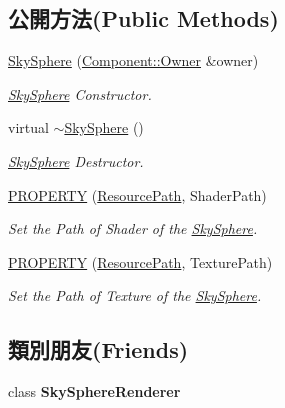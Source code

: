 \subsection*{公開方法(Public Methods)}
\begin{DoxyCompactItemize}
\item 
\hyperlink{class_i_dream_sky_1_1_sky_sphere_a8e55896b6fb27e611be90451c67910a5}{Sky\+Sphere} (\hyperlink{class_i_dream_sky_1_1_component_1_1_owner}{Component\+::\+Owner} \&owner)
\begin{DoxyCompactList}\small\item\em \hyperlink{class_i_dream_sky_1_1_sky_sphere}{Sky\+Sphere} Constructor. \end{DoxyCompactList}\item 
virtual \hyperlink{class_i_dream_sky_1_1_sky_sphere_a4747bb606783031db88b2e622184e6d0}{$\sim$\+Sky\+Sphere} ()
\begin{DoxyCompactList}\small\item\em \hyperlink{class_i_dream_sky_1_1_sky_sphere}{Sky\+Sphere} Destructor. \end{DoxyCompactList}\item 
\hyperlink{class_i_dream_sky_1_1_sky_sphere_a0ea05c034ae155db3e7f71ccfe5bed2f}{P\+R\+O\+P\+E\+R\+TY} (\hyperlink{class_i_dream_sky_1_1_resource_path}{Resource\+Path}, Shader\+Path)
\begin{DoxyCompactList}\small\item\em Set the Path of Shader of the \hyperlink{class_i_dream_sky_1_1_sky_sphere}{Sky\+Sphere}. \end{DoxyCompactList}\item 
\hyperlink{class_i_dream_sky_1_1_sky_sphere_acbf474eba20ef9250858a7564b838637}{P\+R\+O\+P\+E\+R\+TY} (\hyperlink{class_i_dream_sky_1_1_resource_path}{Resource\+Path}, Texture\+Path)
\begin{DoxyCompactList}\small\item\em Set the Path of Texture of the \hyperlink{class_i_dream_sky_1_1_sky_sphere}{Sky\+Sphere}. \end{DoxyCompactList}\end{DoxyCompactItemize}
\subsection*{類別朋友(Friends)}
\begin{DoxyCompactItemize}
\item 
class {\bfseries Sky\+Sphere\+Renderer}\hypertarget{class_i_dream_sky_1_1_sky_sphere_aedc00fb56aa2fd5a50a9641945b117e7}{}\label{class_i_dream_sky_1_1_sky_sphere_aedc00fb56aa2fd5a50a9641945b117e7}

\end{DoxyCompactItemize}


